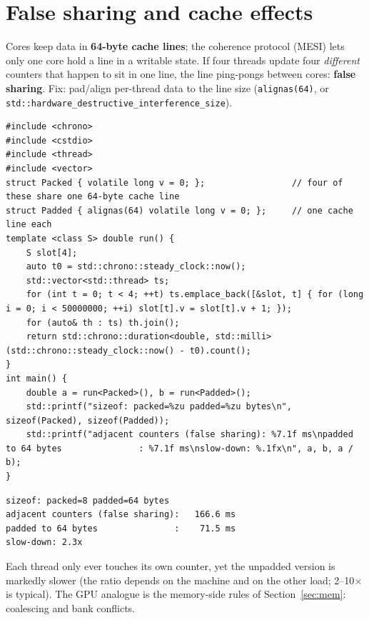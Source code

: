 \documentclass[10pt,a4paper,openany,oneside]{report}
\newcommand{\prio}[1]{\texorpdfstring{\ifcase#1\or{\color{gold}\ding{72}}\or{\color{gold}\ding{72}\ding{72}}\or{\color{gold}\ding{72}\ding{72}\ding{72}}\fi}{}}
\begin{document}
\section{False sharing and cache effects \prio{1}}
Cores keep data in \textbf{64-byte cache lines}; the coherence protocol (MESI) lets only one core hold a line in a writable state. If four threads update four \emph{different} counters that happen to sit in one line, the line ping-pongs between cores: \textbf{false sharing}. Fix: pad/align per-thread data to the line size (\texttt{alignas(64)}, or \texttt{std::hardware\_destructive\_interference\_size}).
\begin{lstlisting}[language={[11]C++},basicstyle=\ttfamily\scriptsize]
#include <chrono>
#include <cstdio>
#include <thread>
#include <vector>
struct Packed { volatile long v = 0; };                 // four of these share one 64-byte cache line
struct Padded { alignas(64) volatile long v = 0; };     // one cache line each
template <class S> double run() {
    S slot[4];
    auto t0 = std::chrono::steady_clock::now();
    std::vector<std::thread> ts;
    for (int t = 0; t < 4; ++t) ts.emplace_back([&slot, t] { for (long i = 0; i < 50000000; ++i) slot[t].v = slot[t].v + 1; });
    for (auto& th : ts) th.join();
    return std::chrono::duration<double, std::milli>(std::chrono::steady_clock::now() - t0).count();
}
int main() {
    double a = run<Packed>(), b = run<Padded>();
    std::printf("sizeof: packed=%zu padded=%zu bytes\n", sizeof(Packed), sizeof(Padded));
    std::printf("adjacent counters (false sharing): %7.1f ms\npadded to 64 bytes               : %7.1f ms\nslow-down: %.1fx\n", a, b, a / b);
}
\end{lstlisting}
\begin{lstlisting}[style=out,basicstyle=\ttfamily\scriptsize,title={Captured output}]
sizeof: packed=8 padded=64 bytes
adjacent counters (false sharing):   166.6 ms
padded to 64 bytes               :    71.5 ms
slow-down: 2.3x
\end{lstlisting}
Each thread only ever touches its own counter, yet the unpadded version is markedly slower (the ratio depends on the machine and on the other load; 2--10$\times$ is typical). The GPU analogue is the memory-side rules of Section~\ref{sec:mem}: coalescing and bank conflicts.
\end{document}
